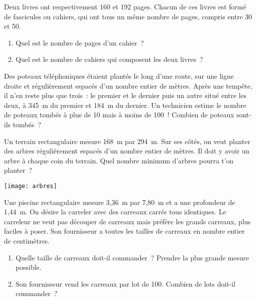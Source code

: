 \begin{exercice}[Pages]
Deux livres ont respectivement 160 et 192 pages. Chacun de ces livres est formé de fascicules ou cahiers, qui ont tous un même nombre de pages, compris entre 30 et 50.
\begin{enumerate}
 \item Quel est le nombre de pages d'un cahier ?
 \item Quel est le nombre de cahiers qui composent les deux livres ?
 \end{enumerate}
\end{exercice}


\begin{exercice}[Tempête]
Des poteaux téléphoniques étaient plantés le long d'une route, sur une ligne droite et régulièrement espacés d'un nombre entier de mètres.
Après une tempête, il n'en reste plus que trois : le premier et le dernier puis un autre situé entre les deux, à 345 m du premier et 184 m du dernier. Un technicien estime le nombre de poteaux tombés à plus de 10 mais à moins de 100 ! Combien de poteaux sont-ils tombés ?
\end{exercice}

\begin{exercice}[Arbres]
Un terrain rectangulaire mesure 168 m par 294 m. Sur ses côtés, on veut planter des arbres régulièrement espacés d'un nombre entier de mètres. Il doit y avoir un arbre à chaque coin du terrain.
Quel nombre minimum d'arbres pourra t'on planter ?
\begin{center} \texttt{[image: arbres]} \end{center}
\end{exercice}


\begin{exercice}[Piscine]
Une piscine rectangulaire mesure 3,36 m par 7,80 m et a une profondeur de 1,44 m. On désire la carreler avec des carreaux carrés tous identiques. Le carreleur ne veut pas découper de carreaux mais préfère les grands carreaux, plus faciles à poser. Son fournisseur a toutes les tailles de carreaux en nombre entier de centimètres.
\begin{enumerate}
 \item Quelle taille de carreaux doit-il commander ? Prendre la plus grande mesure possible.
 \item Son fournisseur vend les carreaux par lot de 100. Combien de lots doit-il commander ?
 \end{enumerate}
\end{exercice}


